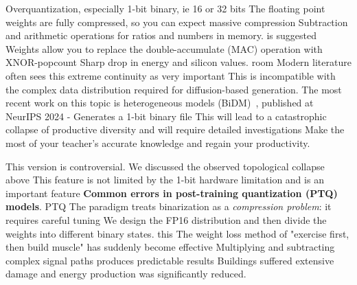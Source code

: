  Overquantization, especially 1-bit binary, ie 16 or 32 bits
 The floating point weights are fully compressed, so you can expect massive compression
 Subtraction and arithmetic operations for ratios and numbers in memory. is suggested
 Weights allow you to replace the double-accumulate (MAC) operation with XNOR-popcount
 Sharp drop in energy and silicon values. room
 Modern literature often sees this extreme continuity as very important
 This is incompatible with the complex data distribution required for diffusion-based generation.
 The most recent work on this topic is heterogeneous models
 (BiDM)~\cite{bidm2024}, published at NeurIPS 2024 - Generates a 1-bit binary file
 This will lead to a catastrophic collapse of productive diversity and will require detailed investigations
 Make the most of your teacher's accurate knowledge and regain your productivity.

 This version is controversial. We discussed the observed topological collapse above
 This feature is not limited by the 1-bit hardware limitation and is an important feature
 \textbf{Common errors in post-training quantization (PTQ) models}. PTQ
 The paradigm treats binarization as a \emph{compression problem}: it requires careful tuning
 We design the FP16 distribution and then divide the weights into different binary states. this
 The weight loss method of "exercise first, then build muscle" has suddenly become effective
 Multiplying and subtracting complex signal paths produces predictable results
 Buildings suffered extensive damage and energy production was significantly reduced.

